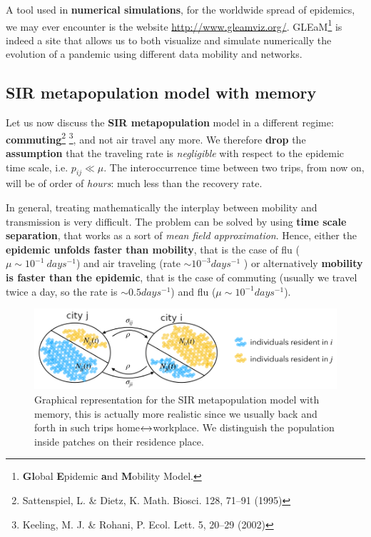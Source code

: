 \documentclass[../main/main.tex]{subfiles}
\begin{document}
A tool used in \textbf{numerical simulations}, for the worldwide spread of epidemics, we may ever encounter is the website \url{http://www.gleamviz.org/}. GLEaM\footnote{\textbf{Gl}obal \textbf{E}pidemic \textbf{a}nd \textbf{M}obility Model.} is indeed a site that allows us to both visualize and simulate numerically the evolution of a pandemic using different data mobility and networks.



\subsection{SIR metapopulation model with memory}

Let us now discuss the \textbf{SIR metapopulation} model in a different regime: \textbf{commuting}\footnote{Sattenspiel, L. \& Dietz, K. Math. Biosci. 128, 71–91 (1995)} \footnote{Keeling, M. J. \& Rohani, P. Ecol. Lett. 5, 20–29 (2002)}, and not air travel any more. We therefore \textbf{drop} the \textbf{assumption} that the traveling rate is \textit{negligible} with respect to the epidemic time scale, i.e. $p_{ij} \ll \mu$. The interoccurrence time between two trips, from now on, will be of order of \textit{hours}: much less than the recovery rate.

In general, treating mathematically the interplay between mobility and transmission is very difficult. The problem can be solved by using \textbf{time scale separation}, that works as a sort of \textit{mean field approximation}. Hence, either the \textbf{epidemic unfolds faster than mobility}, that is the case of flu
($\mu \sim 10^{-1}\ days^{-1}$) and air traveling (rate $\sim 10^{-3} days^{-1}$ ) or alternatively \textbf{mobility is faster than the epidemic}, that is the case of commuting (usually we travel twice a day, so the rate is $\sim 0.5days^{-1}$) and flu ($\mu \sim 10^{-1} days^{-1}$).

\begin{figure}[h!]
\centering
\includegraphics[width=1\textwidth]{../lessons/image/15/image05.png}
\caption{\label{fig:14_05} Graphical representation for the SIR metapopulation model with memory, this is actually more realistic since we usually back and forth in such trips home$\xleftrightarrow[]{}$workplace. We distinguish the population inside patches on their residence place. }
\end{figure}
\end{document}
